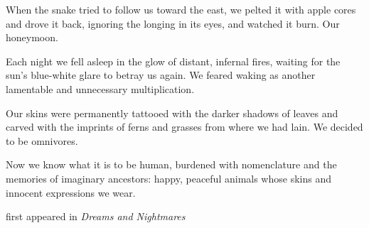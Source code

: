 When the snake tried to follow us toward the east, we pelted it with
apple cores and drove it back, ignoring the longing in its eyes, and
watched it burn. Our honeymoon.

Each night we fell asleep in the glow of distant, infernal fires,
waiting for the sun's blue-white glare to betray us again. We feared
waking as another lamentable and unnecessary multiplication.

Our skins were permanently tattooed with the darker shadows of leaves
and carved with the imprints of ferns and grasses from where we had
lain. We decided to be omnivores.

Now we know what it is to be human, burdened with nomenclature and the
memories of imaginary ancestors: happy, peaceful animals whose skins and
innocent expressions we wear.

first appeared in \emph{Dreams and Nightmares}
